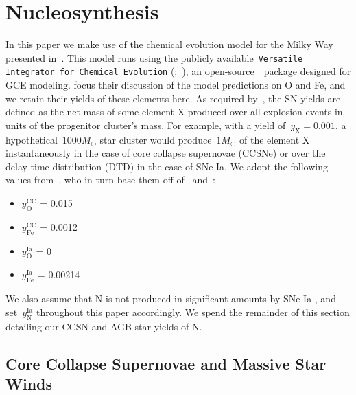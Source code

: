 \documentclass[ms.tex]{subfiles}
\begin{document}
\section{Nucleosynthesis}
\label{sec:yields}

In this paper we make use of the chemical evolution model for the Milky Way
presented in~\citet{Johnson2021}.
This model runs using the publicly available~\texttt{Versatile Integrator for
Chemical Evolution} (\vice;~\citealp{Johnson2020, Griffith2021, Johnson2021}),
an open-source~\python~package designed for GCE modeling.
\citet{Johnson2021} focus their discussion of the model predictions on O and
Fe, and we retain their yields of these elements here.
As required by~\vice, the SN yields are defined as the net mass of some element
X produced over all explosion events in units of the progenitor cluster's
mass.
For example, with a yield of~$y_\text{X} = 0.001$, a hypothetical~$1000 M_\odot$
star cluster would produce~$1 M_\odot$ of the element X instantaneously in the
case of core collapse supernovae (CCSNe) or over the delay-time distribution
(DTD) in the case of SNe Ia.
We adopt the following values from~\citet{Johnson2021}, who in turn base them
off of~\citet*{Weinberg2017} and~\citet{Johnson2020}:
\begin{itemize}
	\item $y_\text{O}^\text{CC}$ = 0.015

	\item $y_\text{Fe}^\text{CC}$ = 0.0012

	\item $y_\text{O}^\text{Ia}$ = 0

	\item $y_\text{Fe}^\text{Ia}$ = 0.00214
\end{itemize}
We also assume that N is not produced in significant amounts by SNe Ia
\citep{Johnson2019}, and set~$y_\text{N}^\text{Ia}$ throughout this paper
accordingly.
We spend the remainder of this section detailing our CCSN and AGB star yields
of N.

\subsection{Core Collapse Supernovae and Massive Star Winds}
\label{sec:yields:ccsne}
\end{document}
